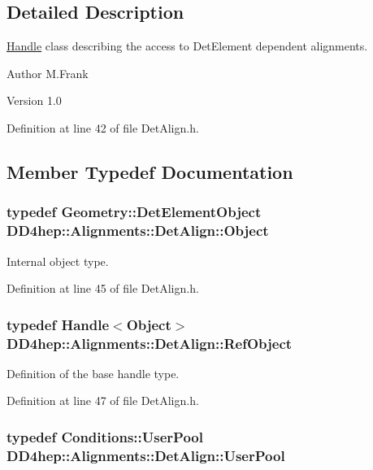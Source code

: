 \subsection{Detailed Description}
\hyperlink{class_d_d4hep_1_1_handle}{Handle} class describing the access to DetElement dependent alignments. \begin{DoxyAuthor}{Author}
M.Frank 
\end{DoxyAuthor}
\begin{DoxyVersion}{Version}
1.0 
\end{DoxyVersion}


Definition at line 42 of file DetAlign.h.

\subsection{Member Typedef Documentation}
\hypertarget{class_d_d4hep_1_1_alignments_1_1_det_align_ae49c039feb46ce85c64fecb6cf669f45}{
\subsubsection[{Object}]{\setlength{\rightskip}{0pt plus 5cm}typedef {\bf Geometry::DetElementObject} {\bf DD4hep::Alignments::DetAlign::Object}}}
\label{class_d_d4hep_1_1_alignments_1_1_det_align_ae49c039feb46ce85c64fecb6cf669f45}


Internal object type. 

Definition at line 45 of file DetAlign.h.\hypertarget{class_d_d4hep_1_1_alignments_1_1_det_align_aefb28d8de174c8d7efe86b45829701ff}{
\subsubsection[{RefObject}]{\setlength{\rightskip}{0pt plus 5cm}typedef {\bf Handle}$<${\bf Object}$>$ {\bf DD4hep::Alignments::DetAlign::RefObject}}}
\label{class_d_d4hep_1_1_alignments_1_1_det_align_aefb28d8de174c8d7efe86b45829701ff}


Definition of the base handle type. 

Definition at line 47 of file DetAlign.h.\hypertarget{class_d_d4hep_1_1_alignments_1_1_det_align_a0595e4c0ee7f454cf5e9c5d32b718aca}{
\subsubsection[{UserPool}]{\setlength{\rightskip}{0pt plus 5cm}typedef {\bf Conditions::UserPool} {\bf DD4hep::Alignments::DetAlign::UserPool}}}
\label{class_d_d4hep_1_1_alignments_1_1_det_align_a0595e4c0ee7f454cf5e9c5d32b718aca}


